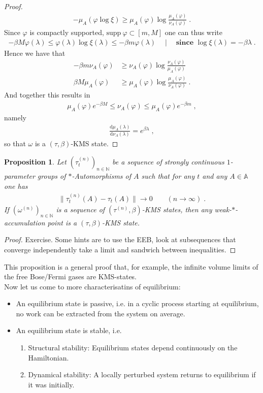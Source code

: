 \documentclass[
a4paper, %
11pt, %
onecolumn, %
openany, %
]{memoir}
\theoremstyle{definition}
\theoremstyle{remark}
\theoremstyle{plain}
\newtheorem{prop}{Proposition}[chapter]
\begin{document}
\begin{proof}
\begin{align}
-\mu_A(\varphi\log\xi)\geq \mu_A(\varphi)\log \frac{\mu_A(\varphi)}{\nu_A(\varphi)}\;.
\end{align}
Since $\varphi$ is compactly supported, $\mathrm{supp}~\varphi\subset [m,M]$ one can thus write \begin{align}
-\beta M\varphi(\lambda)\leq \varphi(\lambda)\log\xi(\lambda)\leq -\beta m \varphi(\lambda) \quad \mid \quad \textbf{since }\log\xi(\lambda)=-\beta\lambda\;.
\end{align}
Hence we have that \begin{align}
-\beta m \nu_A(\varphi)&\geq \nu_A(\varphi)\log\frac{\nu_A(\varphi)}{\mu_A(\varphi)}\\
\beta M\mu_A(\varphi)&\geq \mu_A(\varphi)\log\frac{\mu_A(\varphi)}{\nu_A(\varphi)}\; .
\end{align}
And together this results in \begin{align}
\mu_A(\varphi)e^{-\beta M}\leq \nu_A(\varphi)\leq \mu_A(\varphi)e^{-\beta m}\; ,
\end{align}
namely \begin{align}
\frac{\mathrm{d}\mu_A(\lambda)}{\mathrm{d}\nu_A(\lambda)}=e^{\beta\lambda}\; ,
\end{align}
so that $\omega$ is a $(\tau,\beta)$-KMS state.
\end{proof}
\begin{prop}
Let $(\tau_t^{(n)})_{n\in\mathbb{N}}$ be a sequence of strongly continuous $1$-parameter groups of $*$-Automorphisms of $A$ such that for any $t$ and any $A\in\mathbb{A}$ one has \begin{align}
\|\tau_t^{(n)}(A)-\tau_t(A)\|\rightarrow 0 \qquad (n\rightarrow \infty)\; .
\end{align}
If $(\omega^{(n)})_{n\in\mathbb{N}}$ is a sequence of $(\tau^{(n)},\beta)$-KMS states, then any weak-$*$-accumulation point is a $(\tau,\beta)$-KMS state.
\end{prop}
\begin{proof}
Exercise. Some hints are to use the EEB, look at subsequences that converge independently take a limit and sandwich between inequalities. 
\end{proof}
This proposition is a general proof that, for example, the infinite volume limits of the free Bose/Fermi gases are KMS-states.\\
Now let us come to more characterisatins of equilibrium: \begin{itemize}
\item An equilibrium state is passive, i.e. in a cyclic process starting at equilibrium, no work can be extracted from the system on average.
\item An equilibrium state is stable, i.e. \begin{enumerate}
\item Structural stability: Equilibrium states depend continuously on the Hamiltonian.
\item Dynamical stability: A locally perturbed system returns to equilibrium if it was initially.
\end{enumerate}
\end{itemize}
\end{document}
